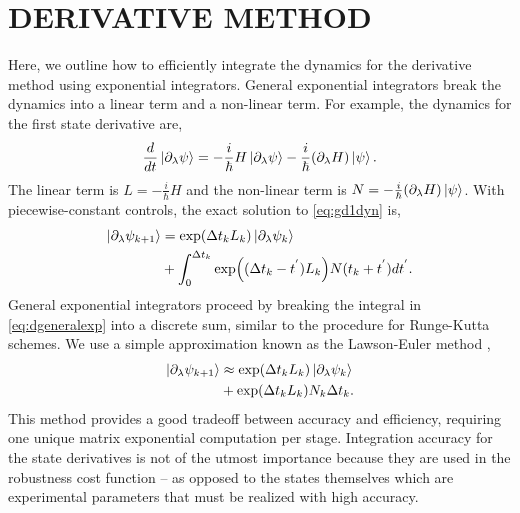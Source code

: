 \documentclass[
  amsfonts,
  amsmath,
  amssymb,
  pra,
  twocolumn,
  superscriptaddress,
]{revtex4-2}
\begin{document}
\section{DERIVATIVE METHOD \label{appendix:derivative}}
Here, we outline how to efficiently integrate the dynamics
for the derivative method using exponential integrators.
General exponential integrators break the dynamics into a linear term and a non-linear term.
For example, the dynamics for the first state derivative
are,
\begin{equation}
\frac{d}{dt} \ket{\partial_{\lambda} \psi} =
-\frac{i}{\hbar} H  \ket{\partial_{\lambda} \psi} -
\frac{i}{\hbar} (\partial_{\lambda} H) \ket{\psi}. \label{eq:gd1dyn}
\end{equation}
The linear term is $L = -\frac{i}{\hbar} H$ and the non-linear
term is $N = -\frac{i}{\hbar} (\partial_{\lambda} H) \ket{\psi}$.
With piecewise-constant controls, the exact solution to \eqref{eq:gd1dyn} is,
\begin{equation}
  \label{eq:dgeneralexp}
  \begin{aligned}
    \ket{\partial_{\lambda} \psi_{k + 1}} &= \exp(\Delta t_{k} L_{k})
    \ket{\partial_{\lambda} \psi_{k}}\\
    &+ \int_{0}^{\Delta t_{k}} \exp((\Delta t_{k} - t^{'})L_{k})
    N(t_{k} + t^{'}) dt^{'}.\\
  \end{aligned}
\end{equation}
General exponential integrators proceed by breaking the integral in \eqref{eq:dgeneralexp}
into a discrete sum, similar to the procedure
for Runge-Kutta schemes. We use a simple approximation known as the Lawson-Euler
method \cite{berland2006solving},
\begin{equation}
  \begin{aligned}
    \ket{\partial_{\lambda} \psi_{k + 1}} &\approx \exp(\Delta t_{k}L_{k})
    \ket{\partial_{\lambda} \psi_{k}}\\
    &+ \exp(\Delta t_{k}L_{k}) N_{k} \Delta t_{k}.\\
  \end{aligned}
\end{equation}
This method provides a good tradeoff between accuracy and efficiency, requiring one unique matrix
exponential computation per stage. Integration accuracy for the state derivatives
is not of the utmost importance because they are used in the robustness cost function -- as
opposed to the states themselves which are experimental parameters that must be realized
with high accuracy.
\end{document}
